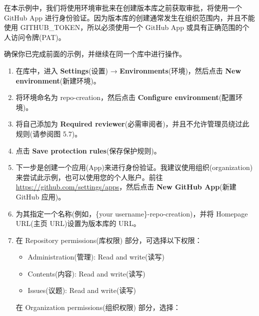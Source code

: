 在本示例中，我们将使用环境审批来在创建版本库之前获取审批，将使用一个 GitHub App 进行身份验证。因为版本库的创建通常发生在组织范围内，并且不能使用 GITHUB\_TOKEN，所以必须使用一个 GitHub App 或具有正确范围的个人访问令牌(PAT)。


确保你已完成前面的示例，并继续在同一个库中进行操作。


\begin{enumerate}
\item 
在库中，进入 \textbf{Settings}(设置) → \textbf{Environments}(环境)，然后点击 \textbf{New environment}(新建环境)。

\item 
将环境命名为 repo-creation，然后点击 \textbf{Configure environment}(配置环境)。

\item 
将自己添加为 \textbf{Required reviewer}(必需审阅者)，并且不允许管理员绕过此规则(请参阅图 5.7)。


\item 
点击 \textbf{Save protection rules}(保存保护规则)。

\item 
下一步是创建一个应用(App)来进行身份验证。我建议使用组织(organization)来尝试此示例，也可以使用您的个人账户。前往 \url{https://github.com/settings/apps}，然后点击 \textbf{New GitHub App}(新建 GitHub 应用)。

\item 
为其指定一个名称(例如，\{your username\}-repo-creation)，并将 Homepage URL(主页 URL)设置为版本库的 URL。

\item 
在 Repository permissions(库权限) 部分，可选择以下权限：

\begin{itemize}
\item 
Administration(管理): Read and write(读写)

\item 
Contents(内容): Read and write(读写)

\item 
Issues(议题): Read and write(读写)
\end{itemize}

在 Organization permissions(组织权限) 部分，选择：


\end{enumerate}
